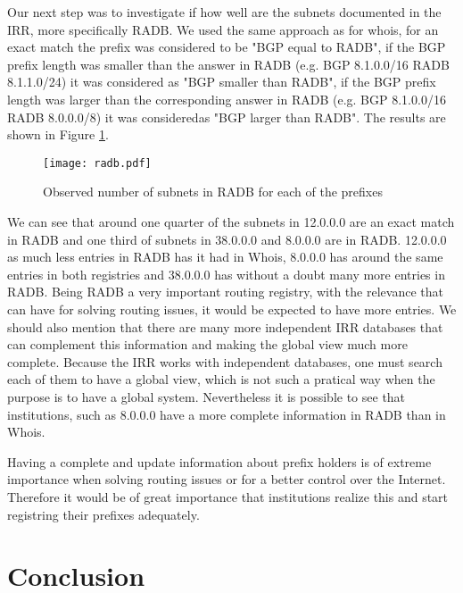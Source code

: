 \documentclass[11pt,a4paper]{scrreprt}
\begin{document}
Our next step was to investigate if how well are the subnets documented in the IRR,  more specifically RADB. We used the same approach as for whois, for an exact match the prefix was considered to be "BGP equal to RADB", if the BGP prefix length was smaller than the answer in RADB (e.g. BGP 8.1.0.0/16 RADB 8.1.1.0/24) it was considered as "BGP smaller than RADB", if the BGP prefix length was larger than the corresponding answer in RADB (e.g. BGP 8.1.0.0/16 RADB 8.0.0.0/8) it was consideredas "BGP larger than RADB". The results are shown in Figure \ref{fig:radb}.

\begin{figure}[!h]
\centering
\texttt{[image: radb.pdf]}
\caption{Observed number of subnets in RADB for each of the prefixes}
\label{fig:radb}
\end{figure}

We can see that around one quarter of the subnets in 12.0.0.0 are an exact match in RADB and one third of subnets in 38.0.0.0 and 8.0.0.0 are in RADB. 12.0.0.0 as much less entries in RADB has it had in Whois, 8.0.0.0 has around the same entries in both registries and 38.0.0.0 has without a doubt many more entries in RADB. Being RADB a very important routing registry, with the relevance that can have for solving routing issues, it would be expected to have more entries. We should also mention that there are many more independent IRR databases that can complement this information and making the global view much more complete. Because the IRR works with independent databases, one must search each of them to have a global view, which is not such a pratical way when the purpose is to have a global system.
Nevertheless it is possible to see that institutions, such as 8.0.0.0 have a more complete information in RADB than in Whois. 

Having a complete and update information about prefix holders is of extreme importance when solving routing issues or for a better control over the Internet. Therefore it would be of great importance that institutions realize this and start registring their prefixes adequately.

\clearpage
\chapter{Conclusion}
\end{document}
